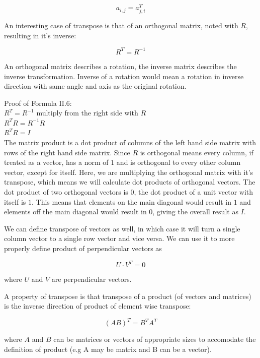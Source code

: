 \[a_{i,j} = a^T_{j,i}\]

An interesting case of transpose is that of an orthogonal matrix, noted with \(R\), resulting in it's inverse:

\begin{equation}R^T = R^{-1} \tag{II.6}\end{equation}

An orthogonal matrix describes a rotation, the inverse matrix describes the inverse transformation. Inverse of a rotation would mean a rotation in inverse direction with same angle and axis as the original rotation.

Proof of Formula II.6:\\
\(R^T = R^{-1}\) multiply from the right side with \(R\)\\
\(R^TR = R^{-1}R\)\\
\(R^TR = I\)\\
The matrix product is a dot product of columns of the left hand side matrix with rows of the right hand side matrix. Since \(R\) is orthogonal means every column, if treated as a vector, has a norm of \(1\) and is orthogonal to every other column vector, except for itself. Here, we are multiplying the orthogonal matrix with it's transpose, which means we will calculate dot products of orthogonal vectors. The dot product of two orthogonal vectors is \(0\), the dot product of a unit vector with itself is \(1\). This means that elements on the main diagonal would result in \(1\) and elements off the main diagonal would result in \(0\), giving the overall result as \(I\).

We can define transpose of vectors as well, in which case it will turn a single column vector to a single row vector and vice versa. We can use it to more properly define product of perpendicular vectors as

\[U  \cdot V^T = 0\]

where \(U\) and \(V\) are perpendicular vectors.

A property of transpose is that transpose of a product (of vectors and matrices) is the inverse direction of product of element wise transpose:

\begin{equation}(AB)^T = B^TA^T \tag{II.7}\end{equation}

where \(A\) and \(B\) can be matrices or vectors of appropriate sizes to accomodate the definition of product (e.g A may be matrix and B can be a vector).

